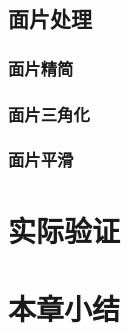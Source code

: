 \subsection{面片处理}

\subsubsection{面片精简}

\subsubsection{面片三角化}

\subsubsection{面片平滑}


\section{实际验证}

\section{本章小结} 